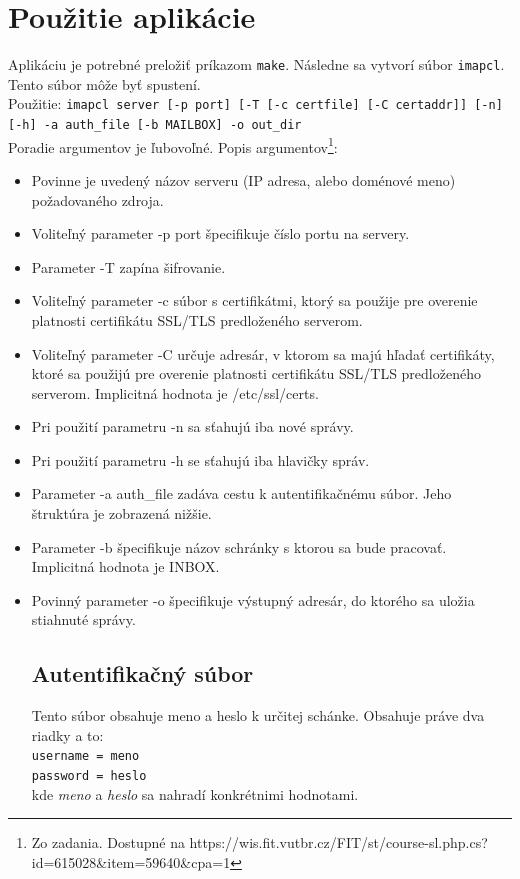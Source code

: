 \documentclass{article}
\begin{document}
\section{Použitie aplikácie}
Aplikáciu je potrebné preložiť príkazom \texttt{make}. Následne sa vytvorí súbor \texttt{imapcl}. Tento súbor môže byť spustení.\\
Použitie: \texttt{imapcl server [-p port] [-T [-c certfile] [-C certaddr]] [-n] [-h] -a auth\_file [-b MAILBOX] -o out\_dir}\\

Poradie argumentov je ľubovoľné. Popis argumentov\footnote{Zo zadania. Dostupné na https://wis.fit.vutbr.cz/FIT/st/course-sl.php.cs?id=615028\&item=59640\&cpa=1}:\\

\begin{itemize}
\item Povinne je uvedený názov serveru (IP adresa, alebo doménové meno) požadovaného zdroja.
\item    Voliteľný parameter -p port špecifikuje číslo portu na servery.
\item    Parameter -T zapína šifrovanie.
\item    Voliteľný parameter -c súbor s certifikátmi, ktorý sa použije pre overenie platnosti certifikátu SSL/TLS predloženého serverom.
\item    Voliteľný parameter -C určuje adresár, v ktorom sa majú hľadať certifikáty, ktoré sa použijú pre overenie platnosti certifikátu SSL/TLS predloženého serverom. Implicitná hodnota je /etc/ssl/certs.
\item    Pri použití parametru -n sa sťahujú iba nové správy.
\item    Pri použití parametru -h se sťahujú iba hlavičky správ.
\item    Parameter -a auth\_file zadáva cestu k autentifikačnému súbor. Jeho štruktúra je zobrazená nižšie.
\item    Parameter -b špecifikuje názov schránky s ktorou sa bude pracovať. Implicitná hodnota je INBOX.
\item    Povinný parameter -o špecifikuje výstupný adresár, do ktorého sa uložia stiahnuté správy.

\subsection{Autentifikačný súbor}
Tento súbor obsahuje meno a heslo k určitej schánke. Obsahuje práve dva riadky a to:\\
\texttt{username = meno\\
password = heslo}\\
kde \textit{meno} a \textit{heslo} sa nahradí konkrétnimi hodnotami.

\end{itemize}
\end{document}
